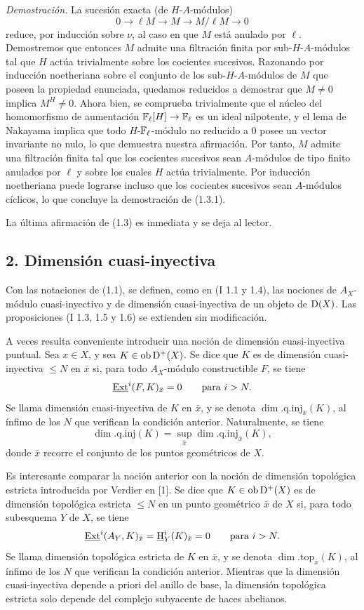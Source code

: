 \emph{Demostración.} La sucesión exacta (de $H$-$A$-módulos)
\[
        0\longrightarrow \ell M\longrightarrow M\longrightarrow M/\ell M\longrightarrow 0
\]
reduce, por inducción sobre $\nu$, al caso en que $M$ está anulado por $\ell$. Demostremos que entonces $M$ admite una filtración finita por sub-$H$-$A$-módulos tal que $H$ actúa trivialmente sobre los cocientes sucesivos. Razonando por inducción noetheriana sobre el conjunto de los sub-$H$-$A$-módulos de $M$ que poseen la propiedad enunciada, quedamos reducidos a demostrar que $M\neq0$ implica $M^H\neq0$. Ahora bien, se comprueba trivialmente que el núcleo del homomorfismo de aumentación $\mathbb{F}_\ell[H]\to\mathbb{F}_\ell$ es un ideal nilpotente, y el lema de Nakayama implica que todo $H$-$\mathbb{F}_\ell$-módulo no reducido a $0$ posee un vector invariante no nulo, lo que demuestra nuestra afirmación. Por tanto, $M$ admite una filtración finita tal que los cocientes sucesivos sean $A$-módulos de tipo finito anulados por $\ell$ y sobre los cuales $H$ actúa trivialmente. Por inducción noetheriana puede lograrse incluso que los cocientes sucesivos sean $A$-módulos cíclicos, lo que concluye la demostración de (1.3.1).

La última afirmación de (1.3) es inmediata y se deja al lector.

\subsection*{2. Dimensión cuasi-inyectiva}

Con las notaciones de (1.1), se definen, como en (I 1.1 y 1.4), las nociones de $A_X$-módulo cuasi-inyectivo y de dimensión cuasi-inyectiva de un objeto de $\mathrm{D}(X)$. Las proposiciones (I 1.3, 1.5 y 1.6) se extienden sin modificación.

A veces resulta conveniente introducir una noción de dimensión cuasi-inyectiva puntual. Sea $x\in X$, y sea $K\in\operatorname{ob} \mathrm{D}^+(X)$. Se dice que $K$ es de dimensión cuasi-inyectiva $\leq N$ en $\bar{x}$ si, para todo $A_X$-módulo constructible $F$, se tiene
\[
        \underline{\operatorname{Ext}}^{i}(F,K)_{\bar{x}}=0\qquad\hbox{para }i>N.
\]
Se llama dimensión cuasi-inyectiva de $K$ en $\bar{x}$, y se denota $\dim.\mathrm{q.inj}_{\bar{x}}(K)$, al ínfimo de los $N$ que verifican la condición anterior. Naturalmente, se tiene
\[
        \dim.\mathrm{q.inj}(K)=\sup_{\bar{x}}\dim.\mathrm{q.inj}_{\bar{x}}(K),
\]
donde $\bar{x}$ recorre el conjunto de los puntos geométricos de $X$.

Es interesante comparar la noción anterior con la noción de dimensión topológica estricta introducida por Verdier en [1]. Se dice que $K\in\operatorname{ob} \mathrm{D}^+(X)$ es de dimensión topológica estricta $\leq N$ en un punto geométrico $\bar{x}$ de $X$ si, para todo subesquema $Y$ de $X$, se tiene
\[
        \underline{\operatorname{Ext}}^{i}(A_Y,K)_{\bar{x}}=\underline{\mathrm H}^i_Y(K)_{\bar{x}}=0\qquad\hbox{para }i>N.
\]
Se llama dimensión topológica estricta de $K$ en $\bar{x}$, y se denota $\dim.\mathrm{top}_{\bar{x}}(K)$, al ínfimo de los $N$ que verifican la condición anterior. Mientras que la dimensión cuasi-inyectiva depende a priori del anillo de base, la dimensión topológica estricta solo depende del complejo subyacente de haces abelianos.

